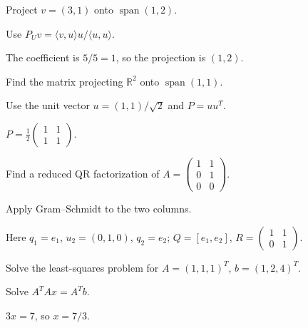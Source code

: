 \begin{exercise}\label{exr:i14-expand-02}
Project \(v=(3,1)\) onto \(\operatorname{span}(1,2)\).
\end{exercise}
\begin{hint}
Use \(P_Uv=\langle v,u\rangle u/\langle u,u\rangle\).
\end{hint}
\begin{solution}
The coefficient is \(5/5=1\), so the projection is \((1,2)\).
\end{solution}

\begin{exercise}\label{exr:i14-expand-03}
Find the matrix projecting \(\mathbb R^2\) onto \(\operatorname{span}(1,1)\).
\end{exercise}
\begin{hint}
Use the unit vector \(u=(1,1)/\sqrt2\) and \(P=uu^T\).
\end{hint}
\begin{solution}
\(P=\frac12\begin{pmatrix}1&1\\1&1\end{pmatrix}\).
\end{solution}

\begin{exercise}[Reduced QR]\label{exr:i14-expand-04}
Find a reduced QR factorization of \(A=\begin{pmatrix}1&1\\0&1\\0&0\end{pmatrix}\).
\end{exercise}
\begin{hint}
Apply Gram--Schmidt to the two columns.
\end{hint}
\begin{solution}
Here \(q_1=e_1\), \(u_2=(0,1,0)\), \(q_2=e_2\); \(Q=[e_1,e_2]\), \(R=\begin{pmatrix}1&1\\0&1\end{pmatrix}\).
\end{solution}

\begin{exercise}\label{exr:i14-expand-05}
Solve the least-squares problem for \(A=(1,1,1)^T\), \(b=(1,2,4)^T\).
\end{exercise}
\begin{hint}
Solve \(A^TAx=A^Tb\).
\end{hint}
\begin{solution}
\(3x=7\), so \(x=7/3\).
\end{solution}

